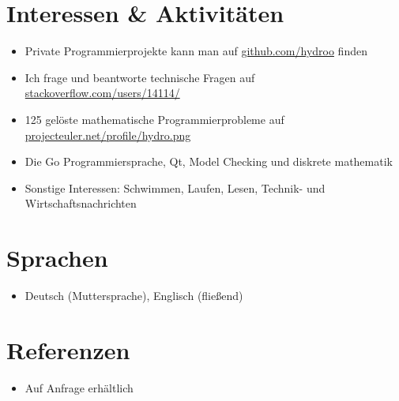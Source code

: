 \vspace{0.66cm} %

\customhrule
\section*{Interessen \& Aktivit\"aten}
\begin{itemize}
	\item Private Programmierprojekte kann man auf \href{https://github.com/hydroo}{github.com/hydroo} finden
	\item Ich frage und beantworte technische Fragen auf \href{http://stackoverflow.com/users/14114/}{stackoverflow.com/users/14114/}
	\item 125 gel\"oste mathematische Programmierprobleme auf \href{http://projecteuler.net/profile/hydro.png}{projecteuler.net/profile/hydro.png}
	\item Die Go Programmiersprache, Qt, Model Checking und diskrete mathematik
	\item Sonstige Interessen: Schwimmen, Laufen, Lesen, Technik- und Wirtschaftsnachrichten
\end{itemize}

\customhrule
\section*{Sprachen}
\begin{itemize}
	\item Deutsch (Muttersprache), Englisch (flie\ss end)
\end{itemize}

\customhrule
\section*{Referenzen}
\begin{itemize}
	\item Auf Anfrage erh\"altlich
\end{itemize}


